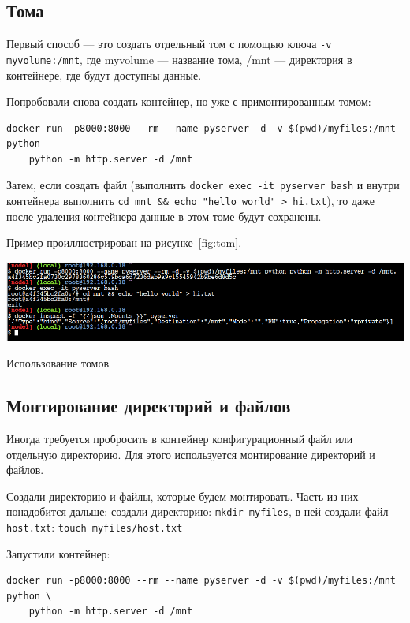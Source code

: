 \subsection{Тома}
Первый способ --- это создать отдельный том с помощью ключа
\texttt{-v myvolume:/mnt}, где myvolume --- название тома,
/mnt --- директория в контейнере, где будут доступны данные.\par
Попробовали снова создать контейнер, но уже с примонтированным томом:

\begin{verbatim}
docker run -p8000:8000 --rm --name pyserver -d -v $(pwd)/myfiles:/mnt python
	python -m http.server -d /mnt
\end{verbatim}

Затем, если создать файл (выполнить \texttt{docker exec -it pyserver bash}
и внутри контейнера выполнить \verb|cd mnt && echo "hello world" > hi.txt|),
то даже после удаления контейнера данные в этом томе будут сохранены.\par
Пример проиллюстрирован на рисунке~\ref{fig:tom}.

\begin{image}
	\includegraphics[width=1\textwidth]{Screenshot from 2023-04-15 16-13-18}
	\caption{Использование томов}
	\label{fig:tom}
\end{image}

\subsection{Монтирование директорий и файлов}
Иногда требуется пробросить в контейнер конфигурационный файл
или отдельную директорию. Для этого используется монтирование директорий
и файлов.\par
Создали директорию и файлы, которые будем монтировать.
Часть из них понадобится дальше: создали директорию:
\texttt{mkdir myfiles}, в ней создали файл \texttt{host.txt}:
\texttt{touch myfiles/host.txt}\par
Запустили контейнер:

\begin{verbatim}
docker run -p8000:8000 --rm --name pyserver -d -v $(pwd)/myfiles:/mnt python \
	python -m http.server -d /mnt
\end{verbatim}


